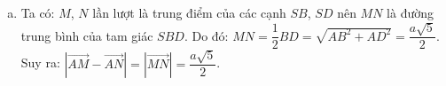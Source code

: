 \begin{ex}
{\begin{enumerate}[a)]
			      Trong tam giác $SAB$ vuông tại $A$ có $AM$ là đường trung tuyến nên: \\
			      $AM=\dfrac{1}{2}SB=\dfrac{a\sqrt{5}}{2}$.\\
			      Lại có: $M$ là trung điểm của $SB$ nên $MB=\dfrac{1}{2}SB=\dfrac{a\sqrt{5}}{2}$. \\
			      Ta tính được: $\cos \widehat{MAB}=\dfrac{MA^2+AB^2-MB^2}{2MA \cdot  AB}=\dfrac{\sqrt{5}}{5}$.\\
			      Mà: $\left(\vec{AM},\vec{AB}\right)=\widehat{MAB}$, suy ra: \\
			      $\vec{AM}\cdot  \vec{AB}=\left| \vec{AM} \right| \cdot  \left| \vec{AB} \right| \cdot  \cos \left(\vec{AM},\vec{AB}\right)=\dfrac{a\sqrt{5}}{2} \cdot  a \cdot  \dfrac{\sqrt{5}}{5}=\dfrac{a^2}{2}$.
			\item Ta có: $M$, $N$ lần lượt là trung điểm của các cạnh $SB$, $SD$ nên $MN$ là đường trung bình của tam giác $SBD$.
			      Do đó: $MN=\dfrac{1}{2}BD=\sqrt{AB^2+AD^2}=\dfrac{a\sqrt{5}}{2}$.\\
			      Suy ra: $\left| \vec{AM}-\vec{AN} \right| =\left| \vec{MN} \right| =\dfrac{a\sqrt{5}}{2}$.
		\end{enumerate}
	}
\end{ex}
